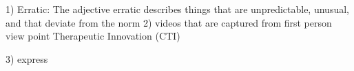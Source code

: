 1) Erratic: The adjective erratic describes things that are unpredictable, unusual, and that deviate from the norm
2) videos that are captured from first person view point
Therapeutic Innovation (CTI)

3) express